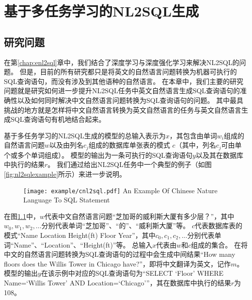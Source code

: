 
\chapter{基于多任务学习的NL2SQL生成}
\label{chap:cnl2sql}

\section{研究问题}

在第\ref{chap:enl2sql}章中，我们结合了深度学习与深度强化学习来解决NL2SQL的问题。
但是，目前的所有研究都只是将英文的自然语言问题转换为机器可执行的SQL查询语句，而没有涉及到其他语种的自然语言。
在本章中，我们主要的研究问题就是研究如何进一步提升NL2SQL任务中英文自然语言生成SQL查询语句的准确性以及如何同时解决中文自然语言问题转换为SQL查询语句的问题。
其中最具挑战的地方就是怎样将中文自然语言转换为英文自然语言的任务与英文自然语言生成SQL查询语句有机地结合起来。

基于多任务学习的NL2SQL生成的模型的总输入表示为$x$，其包含由单词$w_{i}$组成的自然语言问题$w$以及由列名$c_{j}$组成的数据库单张表的模式 $c$（其中，列名$c_{j}$可由单个或多个单词组成）。
模型的输出为一条可执行的SQL查询语句$y$以及其在数据库中执行的结果$r$。
我们通过给出NL2SQL任务中一个典型的例子（如图\ref{fig:nl2sqlexample}所示）来进一步说明。

\begin{figure}[!htp]
    \centering
    \texttt{[image: example/cnl2sql.pdf]}
      {An Example Of Chinese Nature Language To SQL Statement}
    \label{fig:cnl2sqlexample}
  \end{figure}

在图\ref{fig:cnl2sqlexample}中，$w$代表中文自然语言问题“芝加哥的威利斯大厦有多少层？”，其中$w_0,w_1,w_2,...$分别代表单词“芝加哥”、“的”、“威利斯大厦”等。
$c$代表数据库表的模式“Name Location Height(ft) Floor Year”，其中$c_0,c_1,c_2,...$分别代表单词“Name”、“Location”、“Height(ft)”等。
总输入$x$代表由$w$和$c$组成的集合。
在将中文的自然语言问题转换为SQL查询语句的过程中会生成中间结果“How  many  floors  does  the  Willis  Tower  in  Chicago  have?”，即将中文翻译为英文，记作$m$。
模型的输出$y$在该示例中对应的SQL查询语句为“SELECT ‘Floor’ WHERE Name=‘Willis Tower’ AND Location=‘Chicago’”，其在数据库中执行的结果$r$为108。

